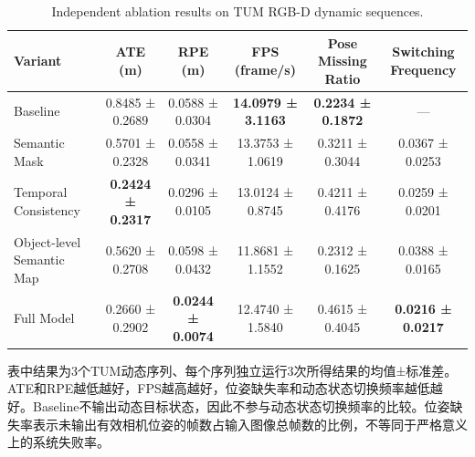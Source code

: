 \begin{table}[htbp]
\centering
\caption{Independent ablation results on TUM RGB-D dynamic sequences.}
\label{tab:independent_ablation_paper}
\begin{tabular}{lccccc}
\toprule
Variant & ATE (m) & RPE (m) & FPS (frame/s) & Pose Missing Ratio & Switching Frequency \\
\midrule
Baseline & 0.8485 ± 0.2689 & 0.0588 ± 0.0304 & \textbf{14.0979 ± 3.1163} & \textbf{0.2234 ± 0.1872} & — \\
Semantic Mask & 0.5701 ± 0.2328 & 0.0558 ± 0.0341 & 13.3753 ± 1.0619 & 0.3211 ± 0.3044 & 0.0367 ± 0.0253 \\
Temporal Consistency & \textbf{0.2424 ± 0.2317} & 0.0296 ± 0.0105 & 13.0124 ± 0.8745 & 0.4211 ± 0.4176 & 0.0259 ± 0.0201 \\
Object-level Semantic Map & 0.5620 ± 0.2708 & 0.0598 ± 0.0432 & 11.8681 ± 1.1552 & 0.2312 ± 0.1625 & 0.0388 ± 0.0165 \\
Full Model & 0.2660 ± 0.2902 & \textbf{0.0244 ± 0.0074} & 12.4740 ± 1.5840 & 0.4615 ± 0.4045 & \textbf{0.0216 ± 0.0217} \\
\bottomrule
\end{tabular}
\vspace{0.5ex}
\begin{minipage}{0.98\linewidth}
\small 表中结果为3个TUM动态序列、每个序列独立运行3次所得结果的均值±标准差。ATE和RPE越低越好，FPS越高越好，位姿缺失率和动态状态切换频率越低越好。Baseline不输出动态目标状态，因此不参与动态状态切换频率的比较。位姿缺失率表示未输出有效相机位姿的帧数占输入图像总帧数的比例，不等同于严格意义上的系统失败率。
\end{minipage}
\end{table}
